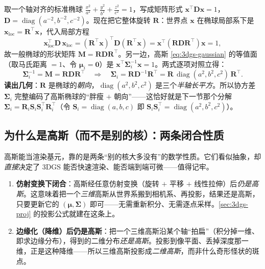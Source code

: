 \begin{derivation}
取一个轴对齐的标准椭球 $\tfrac{x^2}{a^2}+\tfrac{y^2}{b^2}+\tfrac{z^2}{c^2}=1$，写成矩阵形式 $\mathbf x^\top\mathbf D\mathbf x=1$，$\mathbf D=\operatorname{diag}(a^{-2},b^{-2},c^{-2})$。现在把它整体旋转 $\mathbf R$：世界点 $\mathbf x$ 在椭球局部系下是 $\mathbf x_{\mathrm{loc}}=\mathbf R^\top\mathbf x$，代入局部方程
\[
\mathbf x_{\mathrm{loc}}^\top\mathbf D\,\mathbf x_{\mathrm{loc}}=(\mathbf R^\top\mathbf x)^\top\mathbf D(\mathbf R^\top\mathbf x)=\mathbf x^\top(\mathbf R\mathbf D\mathbf R^\top)\mathbf x=1,
\]
故一般椭球的形状矩阵 $\mathbf M=\mathbf R\mathbf D\mathbf R^\top$。另一边，高斯 \cref{eq:3dgs-gaussian} 的等值面（取马氏距离 $=1$、令 $\boldsymbol\mu_i=\mathbf 0$）是 $\mathbf x^\top\boldsymbol\Sigma_i^{-1}\mathbf x=1$。两式逐项对照立得：
\[
\boldsymbol\Sigma_i^{-1}=\mathbf M=\mathbf R\mathbf D\mathbf R^\top
\quad\Longrightarrow\quad
\boldsymbol\Sigma_i=\mathbf R\mathbf D^{-1}\mathbf R^\top=\mathbf R\,\operatorname{diag}(a^2,b^2,c^2)\,\mathbf R^\top.
\]
\textbf{读出几何}：$\mathbf R$ 是椭球的\emph{朝向}，$\operatorname{diag}(a^2,b^2,c^2)$ 是三个\emph{半轴长平方}。所以协方差 $\boldsymbol\Sigma_i$ 完整编码了高斯椭球的“胖瘦 $+$ 朝向”——这恰好就是下一节那个分解 $\boldsymbol\Sigma_i=\mathbf R_i\mathbf S_i\mathbf S_i^\top\mathbf R_i^\top$（令 $\mathbf S_i=\operatorname{diag}(a,b,c)$ 即 $\mathbf S_i\mathbf S_i^\top=\operatorname{diag}(a^2,b^2,c^2)$）。
\end{derivation}

\subsection{为什么是高斯（而不是别的核）：两条闭合性质}

高斯能当渲染基元，靠的是两条“别的核大多没有”的数学性质。它们看似抽象，却\emph{直接}决定了 3DGS 能否快速渲染、能否端到端可微——值得记牢。

\begin{enumerate}
  \item \textbf{仿射变换下闭合}：高斯经任意仿射变换（旋转 $+$ 平移 $+$ 线性拉伸）后\emph{仍是高斯}。这意味着把一个\emph{三维}高斯从世界系搬到相机系、再投影，结果还是高斯，只要更新它的 $(\boldsymbol\mu,\boldsymbol\Sigma)$ 即可——无需重新积分、无需逐点采样。\cref{sec:3dgs-proj} 的投影公式就建在这条上。
  \item \textbf{边缘化（降维）后仍是高斯}：把一个三维高斯沿某个轴“拍扁”（积分掉一维、即求边缘分布），得到的二维分布\emph{还是高斯}。投影到像平面、丢掉深度那一维，正是这种降维——所以三维高斯投影成\emph{二维高斯}，而非什么奇形怪状的斑点。
\end{enumerate}


